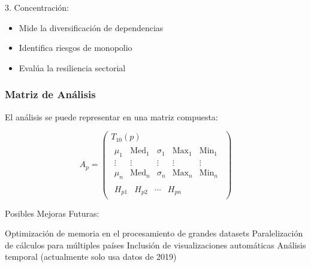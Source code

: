 \documentclass[11pt,a4paper]{article}
\begin{document}
3. Concentración:
\begin{itemize}
    \item Mide la diversificación de dependencias
    \item Identifica riesgos de monopolio
    \item Evalúa la resiliencia sectorial
\end{itemize}

\subsubsection{Matriz de Análisis}

El análisis se puede representar en una matriz compuesta:

\begin{equation}
A_p = \begin{pmatrix}
T_{10}(p) \\
\hline
\begin{matrix}
\mu_1 & \text{Med}_1 & \sigma_1 & \text{Max}_1 & \text{Min}_1 \\
\vdots & \vdots & \vdots & \vdots & \vdots \\
\mu_n & \text{Med}_n & \sigma_n & \text{Max}_n & \text{Min}_n
\end{matrix} \\
\hline
\begin{matrix}
H_{p1} & H_{p2} & \cdots & H_{pn}
\end{matrix}
\end{pmatrix}
\end{equation}


Posibles Mejoras Futuras:


Optimización de memoria en el procesamiento de grandes datasets
Paralelización de cálculos para múltiples países
Inclusión de visualizaciones automáticas
Análisis temporal (actualmente solo usa datos de 2019)
\end{document}
